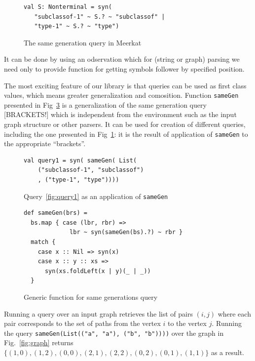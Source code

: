 \begin{figure}[h]
\begin{lstlisting}
val S: Nonterminal = syn(
   "subclassof-1" ~ S.? ~ "subclassof" |
   "type-1" ~ S.? ~ "type")
\end{lstlisting}
\caption{The same generation query in Meerkat}
\label{fig:query1Meerkat}
\end{figure}


It can be done by using an odservation which for (string or graph) parsing we need only to provide function for getting symbols follower by specified position.

The most exciting feature of our library is that queries can be used as first class values, which means greater generalization and comosition. 
Function \lstinline{sameGen} presented in Fig~\ref{fig:gen} is a generalization of the same generation query [BRACKETS!] which is independent from the environment such as the input graph structure or other parsers. It can be used for creation of different queries, including the one presented in Fig~\ref{fig:query1Meerkat}: it is the result of application of \lstinline{sameGen} to the appropriate ``brackets''.

\begin{figure}[h]
\begin{lstlisting}
val query1 = syn( sameGen( List(
    ("subclassof-1", "subclassof")
    , ("type-1", "type"))))
\end{lstlisting}
\caption{Query~\ref{fig:query1} as an application of \lstinline{sameGen}}
\label{fig:query1Gen}
\end{figure}

\begin{figure}[h]
\begin{lstlisting}
def sameGen(brs) =
  bs.map { case (lbr, rbr) => 
             lbr ~ syn(sameGen(bs).?) ~ rbr } 
  match {
    case x :: Nil => syn(x)
    case x :: y :: xs => 
      syn(xs.foldLeft(x | y)(_ | _))
  }
\end{lstlisting}
\caption{Generic function for same generations query}
\label{fig:gen}
\end{figure}

Running a query over an input graph retrieves the list of pairs $(i, j)$ where each pair corresponds to the set of paths from the vertex $i$ to the vertex $j$. Running the query \lstinline{sameGen(List(("a", "a"), ("b", "b"))))} over the graph in Fig.~\ref{fig:graph} returns  $\{(1,0), (1,2), (0,0), (2,1), (2,2), (0,2), (0,1), (1,1)\}$ as a result. 

